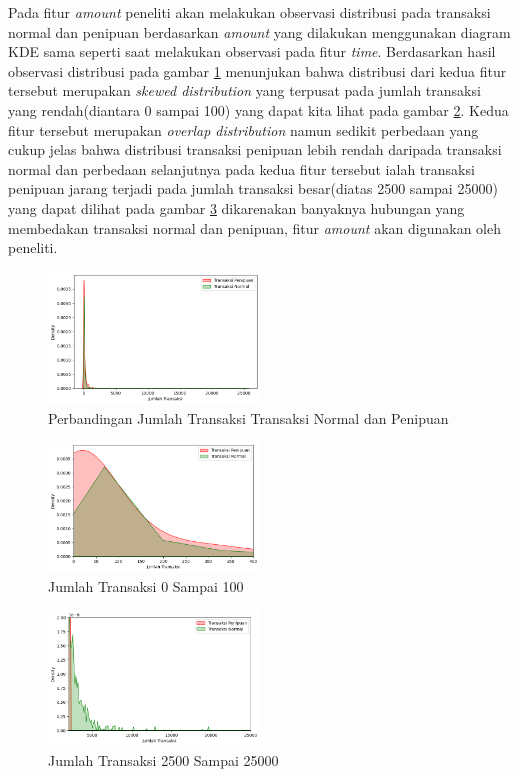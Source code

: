 Pada fitur \textit{amount} peneliti akan melakukan observasi distribusi pada transaksi normal dan penipuan berdasarkan \textit{amount} yang dilakukan menggunakan diagram KDE sama seperti saat melakukan observasi pada fitur \textit{time}. Berdasarkan hasil observasi distribusi pada gambar \ref{fig:3.Perbandingan Jumlah Transaksi Transaksi Normal dan Penipuan} menunjukan bahwa distribusi dari kedua fitur tersebut merupakan \textit{skewed distribution} yang terpusat pada jumlah transaksi yang rendah(diantara 0 sampai 100) yang dapat kita lihat pada gambar \ref{fig:3.Jumlah Transaksi 0 Sampai 100}. Kedua fitur tersebut merupakan \textit{overlap distribution} namun sedikit perbedaan yang cukup jelas bahwa distribusi transaksi penipuan lebih rendah daripada transaksi normal dan perbedaan selanjutnya pada kedua fitur tersebut ialah transaksi penipuan jarang terjadi pada jumlah transaksi besar(diatas 2500 sampai 25000) yang dapat dilihat pada gambar \ref{fig:3.Jumlah Transaksi 2500 Sampai 25000} dikarenakan banyaknya hubungan yang membedakan transaksi normal dan penipuan, fitur \textit{amount} akan digunakan oleh peneliti.
\begin{figure}[H]
	\centering
	\includegraphics[width=0.5\textwidth]{figure/jumlah transaksi.png}
	\caption{Perbandingan Jumlah Transaksi Transaksi Normal dan Penipuan}
	\label{fig:3.Perbandingan Jumlah Transaksi Transaksi Normal dan Penipuan}
\end{figure}
\begin{figure}[H]
	\centering
	\includegraphics[width=0.5\textwidth]{figure/nolsampaiseratus.png}
	\caption{Jumlah Transaksi 0 Sampai 100}
	\label{fig:3.Jumlah Transaksi 0 Sampai 100}
\end{figure}
\begin{figure}[H]
	\centering
	\includegraphics[width=0.5\textwidth]{figure/jumlahtransaksiduaribulimaratus.png}
	\caption{Jumlah Transaksi 2500 Sampai 25000}
	\label{fig:3.Jumlah Transaksi 2500 Sampai 25000}
\end{figure}

